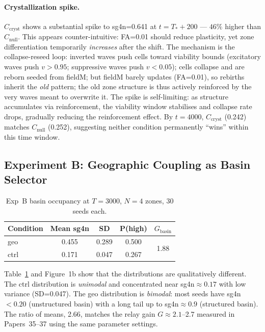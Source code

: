 \documentclass[11pt]{article}
\begin{document}
\paragraph{Crystallization spike.}
$C_\mathrm{cryst}$ shows a substantial spike to sg4n=0.641 at $t=T_*+200$
--- $46\%$ higher than $C_\mathrm{null}$.
This appears counter-intuitive: FA=0.01 should reduce plasticity, yet
zone differentiation temporarily \emph{increases} after the shift.
The mechanism is the collapse-reseed loop:
inverted waves push cells toward viability bounds (excitatory waves push
$v > 0.95$; suppressive waves push $v < 0.05$);
cells collapse and are reborn seeded from fieldM;
but fieldM barely updates (FA=0.01), so rebirths inherit the \emph{old}
pattern;
the old zone structure is thus actively reinforced by the very waves meant
to overwrite it.
The spike is self-limiting: as structure accumulates via reinforcement,
the viability window stabilises and collapse rate drops, gradually reducing
the reinforcement effect.
By $t=4000$, $C_\mathrm{cryst}$ (0.242) matches $C_\mathrm{null}$ (0.252),
suggesting neither condition permanently ``wins'' within this time window.

\subsection{Experiment B: Geographic Coupling as Basin Selector}

\begin{table}[h]
  \centering
  \caption{Exp~B basin occupancy at $T=3000$, $N=4$ zones, 30 seeds each.}
  \label{tab:expb}
  \small
  \begin{tabular}{lcccc}
    \toprule
    Condition & Mean sg4n & SD & P(high) & $G_\mathrm{basin}$ \\
    \midrule
    geo  & 0.455 & 0.289 & 0.500 & \multirow{2}{*}{1.88} \\
    ctrl & 0.171 & 0.047 & 0.267 & \\
    \bottomrule
  \end{tabular}
\end{table}

Table~\ref{tab:expb} and Figure~1b show that the distributions are
qualitatively different.
The ctrl distribution is \emph{unimodal} and concentrated near sg4n$\approx
0.17$ with low variance (SD=0.047).
The geo distribution is \emph{bimodal}: most seeds have sg4n$<0.20$
(unstructured basin) with a long tail up to sg4n$\approx 0.9$ (structured
basin).
The ratio of means, 2.66, matches the relay gain $G\approx 2.1$--2.7
measured in Papers~35--37 using the same parameter settings.
\end{document}
